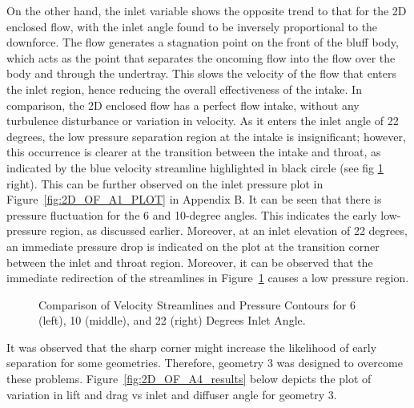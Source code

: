 \noindent On the other hand, the inlet variable shows the opposite  trend to that for the 2D enclosed flow, with the inlet angle found to be inversely proportional to the downforce. The flow generates a stagnation point on the front of the bluff body, which acts as the point that separates the oncoming flow into the flow over the body and through the undertray. This slows the velocity of the flow that enters the inlet region, hence reducing the overall effectiveness of the intake. In comparison, the 2D enclosed flow has a perfect flow intake, without any turbulence disturbance or variation in velocity. As it enters the inlet angle of 22 degrees, the low pressure separation region at the intake is insignificant; however, this occurrence is clearer at the transition between the intake and throat, as indicated by the blue velocity streamline highlighted in black circle (see fig \ref{fig:A1_Contour_inlet_compare} right). This can be further observed on the inlet pressure plot in Figure~\ref{fig:2D_OF_A1_PLOT} in Appendix B. It can be seen that there is pressure fluctuation for the 6 and 10-degree angles. This indicates the early low-pressure region, as discussed earlier. Moreover, at an inlet elevation of 22 degrees, an immediate pressure drop is indicated on the plot at the transition corner between the inlet and throat region. Moreover, it can be observed that the immediate redirection of the streamlines in Figure~\ref{fig:A1_Contour_inlet_compare} causes a low pressure region.

\begin{figure}[!h]
   \noindent{}
   \caption{Comparison of Velocity Streamlines and Pressure Contours for 6 (left), 10 (middle), and 22 (right) Degrees Inlet Angle.}
   \label{fig:A1_Contour_inlet_compare}
\end{figure}

\noindent It was observed that the sharp corner might increase the likelihood of early separation for some geometries. Therefore, geometry 3 was designed to overcome these problems. Figure~\ref{fig:2D_OF_A4_results} below depicts the plot of variation in lift and drag vs inlet and diffuser angle for geometry 3.

